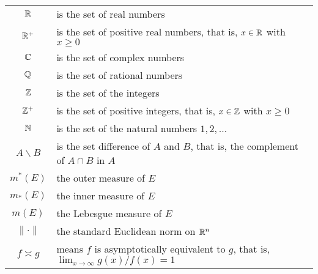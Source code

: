 \begin{tabular}{cl}
  $\mathbb{R}$ & is the set of real numbers\\
  $\mathbb{R}^+$ & is the set of positive real numbers, that is, $x\in\mathbb{R}$ with
             $x\geq 0$\\
  $\mathbb{C}$ & is the set of complex numbers\\
  $\mathbb{Q}$ & is the set of rational numbers\\
  $\mathbb{Z}$ & is the set of the integers\\
  $\mathbb{Z}^+$ & is the set of positive integers, that is, $x\in\mathbb{Z}$ with
             $x\geq 0$\\
  $\mathbb{N}$ & is the set of the natural numbers $1,2,\dotsc$\\
  $A\smallsetminus B$ & is the set difference of $A$ and $B$, that is, the
                        complement of $A\cap B$ in $A$\\
  $m^*(E)$ & the outer measure of $E$\\
  $m_*(E)$ & the inner measure of $E$\\
  $m(E)$ & the Lebesgue measure of $E$\\
  $\|\cdot\|$ & the standard Euclidean norm on $\mathbb{R}^n$\\
  $f\asymp g$ & means $f$ is asymptotically equivalent to $g$, that is,
                $\lim_{x\to\infty} g(x)/f(x)=1$\\
\end{tabular}

\newpage

